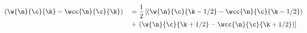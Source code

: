 $$\begin{aligned}
    & (\w{\n}{\c}{\k} - \wcc{\n}{\c}{\k}) &  & = \frac{1}{2} \left[(\w{\n}{\c}{\k-1/2} - \wcc{\n}{\c}{\k-1/2})\right. \\
    &                                     &  & + \left.(\w{\n}{\c}{\k+1/2} - \wcc{\n}{\c}{\k+1/2})\right]
\end{aligned}$$